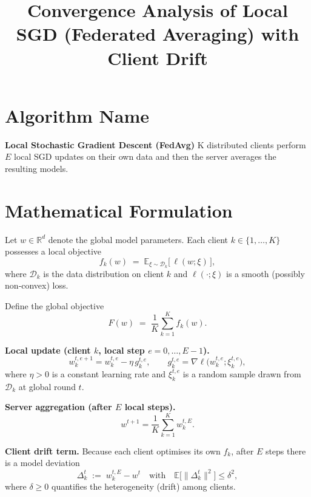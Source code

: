 \documentclass{article}
\title{Convergence Analysis of Local SGD (Federated Averaging) with Client Drift}
\author{}
\date{}
\begin{document}
\maketitle

\section*{Algorithm Name}
\textbf{Local Stochastic Gradient Descent (FedAvg)}  
K distributed clients perform $E$ local SGD updates on their own data
and then the server averages the resulting models.

\section*{Mathematical Formulation}
Let $w\in\mathbb{R}^d$ denote the global model parameters.  
Each client $k\in\{1,\dots,K\}$ possesses a local objective
\[
f_k(w) \;=\; \mathbb{E}_{\xi\sim\mathcal{D}_k}\big[\,\ell(w;\xi)\,\big],
\]
where $\mathcal{D}_k$ is the data distribution on client $k$ and
$\ell(\cdot;\xi)$ is a smooth (possibly non‑convex) loss.

Define the global objective
\[
F(w)\;=\;\frac1K\sum_{k=1}^K f_k(w).
\]

\textbf{Local update (client $k$, local step $e=0,\dots,E-1$).}
\[
w_{k}^{t,e+1}= w_{k}^{t,e} - \eta\, g_{k}^{t,e},
\qquad 
g_{k}^{t,e}= \nabla\ell\big(w_{k}^{t,e};\xi_{k}^{t,e}\big),
\]
where $\eta>0$ is a constant learning rate and $\xi_{k}^{t,e}$ is a random
sample drawn from $\mathcal{D}_k$ at global round $t$.

\textbf{Server aggregation (after $E$ local steps).}
\[
w^{t+1}= \frac1K\sum_{k=1}^K w_{k}^{t,E}.
\]

\textbf{Client drift term.}  
Because each client optimises its own $f_k$, after $E$ steps there is a
model deviation
\[
\Delta_k^{t} \;:=\; w_{k}^{t,E} - w^{t}
\quad\text{with}\quad
\mathbb{E}\!\big[\|\Delta_k^{t}\|^2\big]\le \delta^2,
\tag{1}
\]
where $\delta\ge 0$ quantifies the heterogeneity (drift) among clients.

\end{document}
